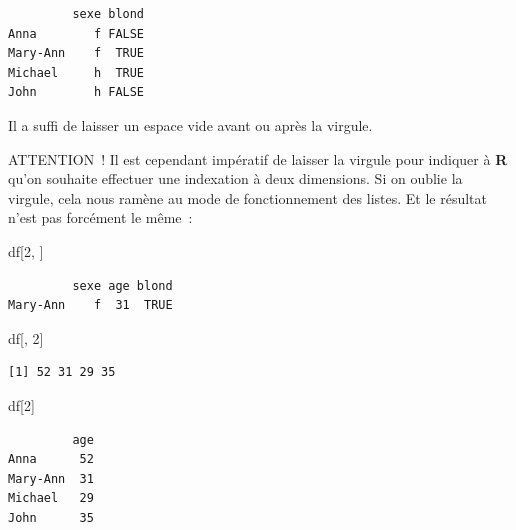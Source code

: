 \documentclass[
  letterpaper,
  DIV=11,
  numbers=noendperiod,
  oneside]{scrreprt}
\newenvironment{Shaded}{\begin{snugshade}}{\end{snugshade}}
\newcommand{\DecValTok}[1]{\textcolor[rgb]{0.68,0.00,0.00}{#1}}
\newcommand{\NormalTok}[1]{\textcolor[rgb]{0.00,0.23,0.31}{#1}}
\begin{document}
\begin{verbatim}
         sexe blond
Anna        f FALSE
Mary-Ann    f  TRUE
Michael     h  TRUE
John        h FALSE
\end{verbatim}

Il a suffi de laisser un espace vide avant ou après la virgule.

\begin{tcolorbox}[enhanced jigsaw, colbacktitle=quarto-callout-warning-color!10!white, opacityback=0, toprule=.15mm, colback=white, coltitle=black, bottomtitle=1mm, toptitle=1mm, titlerule=0mm, rightrule=.15mm, title=\textcolor{quarto-callout-warning-color}{\faExclamationTriangle}\hspace{0.5em}{Avertissement}, breakable, bottomrule=.15mm, opacitybacktitle=0.6, arc=.35mm, left=2mm, leftrule=.75mm, colframe=quarto-callout-warning-color-frame]

ATTENTION~! Il est cependant impératif de laisser la virgule pour
indiquer à \textbf{R} qu'on souhaite effectuer une indexation à deux
dimensions. Si on oublie la virgule, cela nous ramène au mode de
fonctionnement des listes. Et le résultat n'est pas forcément le même~:

\begin{Shaded}
\begin{Highlighting}[]
\NormalTok{df[}\DecValTok{2}\NormalTok{, ]}
\end{Highlighting}
\end{Shaded}

\begin{verbatim}
         sexe age blond
Mary-Ann    f  31  TRUE
\end{verbatim}

\begin{Shaded}
\begin{Highlighting}[]
\NormalTok{df[, }\DecValTok{2}\NormalTok{]}
\end{Highlighting}
\end{Shaded}

\begin{verbatim}
[1] 52 31 29 35
\end{verbatim}

\begin{Shaded}
\begin{Highlighting}[]
\NormalTok{df[}\DecValTok{2}\NormalTok{]}
\end{Highlighting}
\end{Shaded}

\begin{verbatim}
         age
Anna      52
Mary-Ann  31
Michael   29
John      35
\end{verbatim}

\end{tcolorbox}
\end{document}
